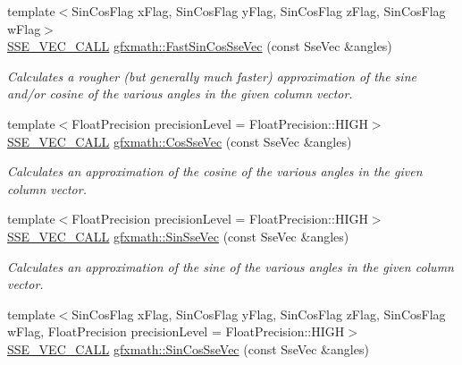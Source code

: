 \begin{DoxyCompactItemize}
{\footnotesize template$<$Sin\+Cos\+Flag x\+Flag, Sin\+Cos\+Flag y\+Flag, Sin\+Cos\+Flag z\+Flag, Sin\+Cos\+Flag w\+Flag$>$ }\\\hyperlink{ssevec__math__defs_8h_a97454f977a5281455cecacce1e8ba670}{S\+S\+E\+\_\+\+V\+E\+C\+\_\+\+C\+A\+L\+L} \hyperlink{group___s_i_m_d_vec_math_ga56422f47686527c4e2ea76f2cbf8d8c8}{gfxmath\+::\+Fast\+Sin\+Cos\+Sse\+Vec} (const Sse\+Vec \&angles)
\begin{DoxyCompactList}\small\item\em Calculates a rougher (but generally much faster) approximation of the sine and/or cosine of the various angles in the given column vector. \end{DoxyCompactList}\item 
{\footnotesize template$<$Float\+Precision precision\+Level = Float\+Precision\+::\+H\+I\+G\+H$>$ }\\\hyperlink{ssevec__math__defs_8h_a97454f977a5281455cecacce1e8ba670}{S\+S\+E\+\_\+\+V\+E\+C\+\_\+\+C\+A\+L\+L} \hyperlink{group___s_i_m_d_vec_math_gadfd52b1db588193d4c0e9ba2f4011557}{gfxmath\+::\+Cos\+Sse\+Vec} (const Sse\+Vec \&angles)
\begin{DoxyCompactList}\small\item\em Calculates an approximation of the cosine of the various angles in the given column vector. \end{DoxyCompactList}\item 
{\footnotesize template$<$Float\+Precision precision\+Level = Float\+Precision\+::\+H\+I\+G\+H$>$ }\\\hyperlink{ssevec__math__defs_8h_a97454f977a5281455cecacce1e8ba670}{S\+S\+E\+\_\+\+V\+E\+C\+\_\+\+C\+A\+L\+L} \hyperlink{group___s_i_m_d_vec_math_ga5c7bfdfe4ecf8c31e97f9702d6d585f8}{gfxmath\+::\+Sin\+Sse\+Vec} (const Sse\+Vec \&angles)
\begin{DoxyCompactList}\small\item\em Calculates an approximation of the sine of the various angles in the given column vector. \end{DoxyCompactList}\item 
{\footnotesize template$<$Sin\+Cos\+Flag x\+Flag, Sin\+Cos\+Flag y\+Flag, Sin\+Cos\+Flag z\+Flag, Sin\+Cos\+Flag w\+Flag, Float\+Precision precision\+Level = Float\+Precision\+::\+H\+I\+G\+H$>$ }\\\hyperlink{ssevec__math__defs_8h_a97454f977a5281455cecacce1e8ba670}{S\+S\+E\+\_\+\+V\+E\+C\+\_\+\+C\+A\+L\+L} \hyperlink{group___s_i_m_d_vec_math_gaabdfaffa8375fc3947285edb2533270f}{gfxmath\+::\+Sin\+Cos\+Sse\+Vec} (const Sse\+Vec \&angles)

\end{DoxyCompactItemize}
